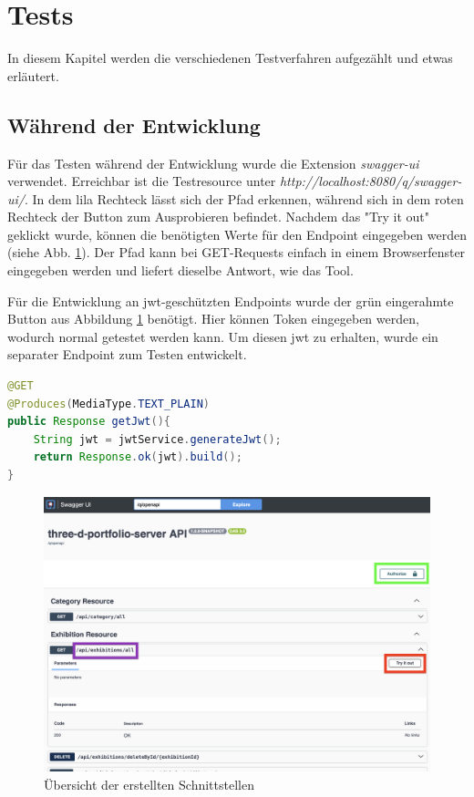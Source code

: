 \section{Tests}
In diesem Kapitel werden die verschiedenen Testverfahren aufgezählt und etwas erläutert.  

\subsection{Während der Entwicklung}
\label{chapter:implementation:tests}
Für das Testen während der Entwicklung wurde die Extension \emph{swagger-ui} verwendet. 
Erreichbar ist die Testresource unter \emph{http://localhost:8080/q/swagger-ui/}. 
In dem lila Rechteck lässt sich der Pfad erkennen, während sich in dem roten Rechteck der Button zum Ausprobieren befindet. 
Nachdem das "Try it out" geklickt wurde, können die benötigten Werte für den Endpoint eingegeben werden (siehe Abb. \ref{fig:implementation:swaggerui}). 
Der Pfad kann bei GET-Requests einfach in einem Browserfenster eingegeben werden und liefert dieselbe Antwort, wie das Tool. 

Für die Entwicklung an \gls{jwt}-geschützten Endpoints wurde der grün eingerahmte Button aus Abbildung \ref{fig:implementation:swaggerui} benötigt. 
Hier können Token eingegeben werden, wodurch normal getestet werden kann. 
Um diesen \gls{jwt} zu erhalten, wurde ein separater Endpoint zum Testen entwickelt. 

\begin{lstlisting}[label=lst:test:testjwt, language=Java]
@GET
@Produces(MediaType.TEXT_PLAIN)
public Response getJwt(){
    String jwt = jwtService.generateJwt();
    return Response.ok(jwt).build();
}
\end{lstlisting}

\begin{figure}
    \centering
    \includegraphics[scale=0.3]{pics/swaggerui.png}
    \caption{Übersicht der erstellten Schnittstellen}
    \label{fig:implementation:swaggerui}
\end{figure}

